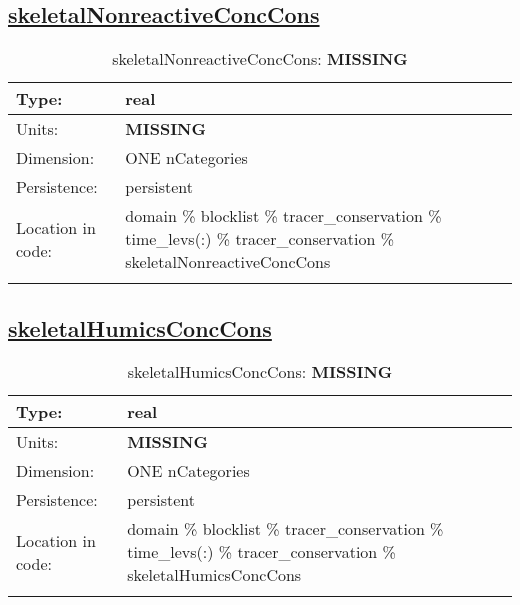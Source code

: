 \subsection[skeletalNonreactiveConcCons]{\hyperref[sec:var_tab_tracer_conservation]{skeletalNonreactiveConcCons}}
\label{subsec:var_sec_tracer_conservation_skeletalNonreactiveConcCons}
\begin{center}
\begin{longtable}{| p{2.0in} | p{4.0in} |}
        \hline 
        Type: & real \\
        \hline 
        Units: & {\bf \color{red} MISSING} \\
        \hline 
        Dimension: & ONE nCategories \\
        \hline 
        Persistence: & persistent \\
        \hline 
         Location in code: & domain \% blocklist \% tracer\_conservation \% time\_levs(:) \% tracer\_conservation \% skeletalNonreactiveConcCons \\
         \hline 
    \caption{skeletalNonreactiveConcCons: {\bf \color{red} MISSING}}
\end{longtable}
\end{center}
\subsection[skeletalHumicsConcCons]{\hyperref[sec:var_tab_tracer_conservation]{skeletalHumicsConcCons}}
\label{subsec:var_sec_tracer_conservation_skeletalHumicsConcCons}
\begin{center}
\begin{longtable}{| p{2.0in} | p{4.0in} |}
        \hline 
        Type: & real \\
        \hline 
        Units: & {\bf \color{red} MISSING} \\
        \hline 
        Dimension: & ONE nCategories \\
        \hline 
        Persistence: & persistent \\
        \hline 
         Location in code: & domain \% blocklist \% tracer\_conservation \% time\_levs(:) \% tracer\_conservation \% skeletalHumicsConcCons \\
         \hline 
    \caption{skeletalHumicsConcCons: {\bf \color{red} MISSING}}
\end{longtable}
\end{center}
